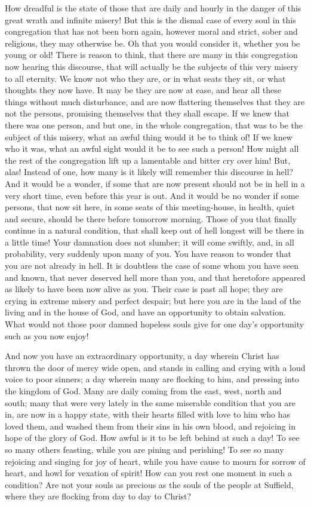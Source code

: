 \documentclass[
]{book}
\begin{document}
How dreadful is the state of those that are daily and hourly in the danger of this great wrath and infinite misery! But this is the dismal case of every soul in this congregation that has not been born again, however moral and strict, sober and religious, they may otherwise be. Oh that you would consider it, whether you be young or old! There is reason to think, that there are many in this congregation now hearing this discourse, that will actually be the subjects of this very misery to all eternity. We know not who they are, or in what seats they sit, or what thoughts they now have. It may be they are now at ease, and hear all these things without much disturbance, and are now flattering themselves that they are not the persons, promising themselves that they shall escape. If we knew that there was one person, and but one, in the whole congregation, that was to be the subject of this misery, what an awful thing would it be to think of! If we knew who it was, what an awful sight would it be to see such a person! How might all the rest of the congregation lift up a lamentable and bitter cry over him! But, alas! Instead of one, how many is it likely will remember this discourse in hell? And it would be a wonder, if some that are now present should not be in hell in a very short time, even before this year is out. And it would be no wonder if some persons, that now sit here, in some seats of this meeting-house, in health, quiet and secure, should be there before tomorrow morning. Those of you that finally continue in a natural condition, that shall keep out of hell longest will be there in a little time! Your damnation does not slumber; it will come swiftly, and, in all probability, very suddenly upon many of you. You have reason to wonder that you are not already in hell. It is doubtless the case of some whom you have seen and known, that never deserved hell more than you, and that heretofore appeared as likely to have been now alive as you. Their case is past all hope; they are crying in extreme misery and perfect despair; but here you are in the land of the living and in the house of God, and have an opportunity to obtain salvation. What would not those poor damned hopeless souls give for one day's opportunity such as you now enjoy!

And now you have an extraordinary opportunity, a day wherein Christ has thrown the door of mercy wide open, and stands in calling and crying with a loud voice to poor sinners; a day wherein many are flocking to him, and pressing into the kingdom of God. Many are daily coming from the east, west, north and south; many that were very lately in the same miserable condition that you are in, are now in a happy state, with their hearts filled with love to him who has loved them, and washed them from their sins in his own blood, and rejoicing in hope of the glory of God. How awful is it to be left behind at such a day! To see so many others feasting, while you are pining and perishing! To see so many rejoicing and singing for joy of heart, while you have cause to mourn for sorrow of heart, and howl for vexation of spirit! How can you rest one moment in such a condition? Are not your souls as precious as the souls of the people at Suffield, where they are flocking from day to day to Christ?
\end{document}
